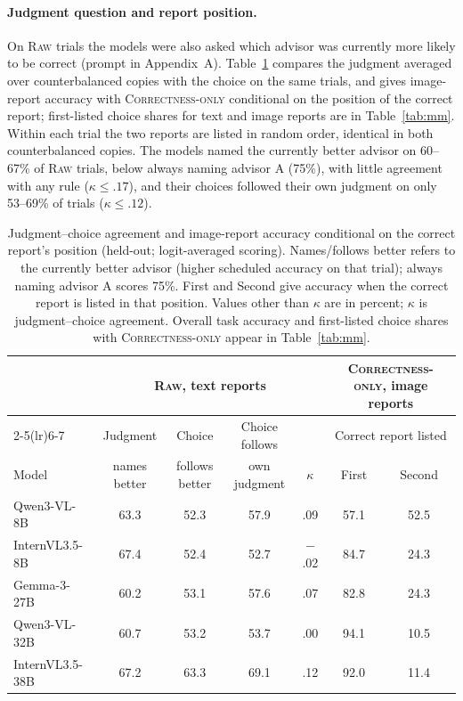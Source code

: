 \documentclass[letterpaper]{article} %
\newcommand{\Raw}{\textsc{Raw}}
\newcommand{\CorrectnessOnly}{\textsc{Correctness-only}}
\begin{document}
\paragraph{Judgment question and report position.} On \Raw{} trials the models were also asked which advisor was currently more likely to be correct (prompt in Appendix~A). Table~\ref{tab:judgpos} compares the judgment averaged over counterbalanced copies with the choice on the same trials, and gives image-report accuracy with \CorrectnessOnly{} conditional on the position of the correct report; first-listed choice shares for text and image reports are in Table~\ref{tab:mm}. Within each trial the two reports are listed in random order, identical in both counterbalanced copies. The models named the currently better advisor on 60--67\% of \Raw{} trials, below always naming advisor A (75\%), with little agreement with any rule ($\kappa\le .17$), and their choices followed their own judgment on only 53--69\% of trials ($\kappa\le .12$).
\begin{table}[!t]\centering\small
  \setlength{\tabcolsep}{3.5pt}
  \begin{tabular}{l ccc c cc}
    \toprule
    & \multicolumn{4}{c}{\Raw{}, text reports} & \multicolumn{2}{c}{\CorrectnessOnly{}, image reports} \\
    \cmidrule(lr){2-5}\cmidrule(lr){6-7}
    & Judgment & Choice & Choice follows & & \multicolumn{2}{c}{Correct report listed} \\
    Model & names better & follows better & own judgment & $\kappa$ & First & Second \\
    \midrule
    Qwen3-VL-8B & 63.3 & 52.3 & 57.9 & .09 & 57.1 & 52.5 \\
    InternVL3.5-8B & 67.4 & 52.4 & 52.7 & $-$.02 & 84.7 & 24.3 \\
    Gemma-3-27B & 60.2 & 53.1 & 57.6 & .07 & 82.8 & 24.3 \\
    Qwen3-VL-32B & 60.7 & 53.2 & 53.7 & .00 & 94.1 & 10.5 \\
    InternVL3.5-38B & 67.2 & 63.3 & 69.1 & .12 & 92.0 & 11.4 \\
    \bottomrule
  \end{tabular}
  \caption{Judgment--choice agreement and image-report accuracy conditional on the correct report's position (held-out; logit-averaged scoring). Names/follows better refers to the currently better advisor (higher scheduled accuracy on that trial); always naming advisor A scores 75\%. First and Second give accuracy when the correct report is listed in that position. Values other than $\kappa$ are in percent; $\kappa$ is judgment--choice agreement. Overall task accuracy and first-listed choice shares with \CorrectnessOnly{} appear in Table~\ref{tab:mm}.}
  \label{tab:judgpos}
\end{table}
\end{document}
